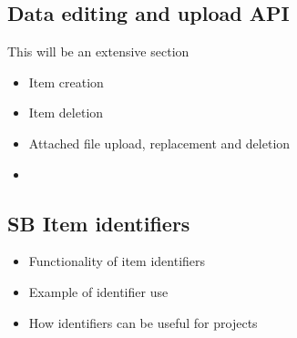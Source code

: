 
\subsection{Data editing and upload API}
This will be an extensive section
\begin{itemize}
	\item{Item creation}
	\item{Item deletion}
	\item{Attached file upload, replacement and deletion}
	\item{}
\end{itemize}

\subsection{SB Item identifiers}
\begin{itemize}
	\item{Functionality of item identifiers}
	\item{Example of identifier use}
	\item{How identifiers can be useful for projects}
\end{itemize}
